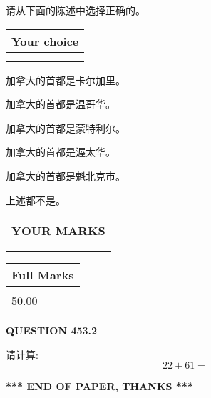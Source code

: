 \documentclass{ctexart}
\begin{document}
  
请从下面的陈述中选择正确的。
  
  
\noindent\hspace{3.0in} \begin{tabular}{|l|}
\hline
Your choice \\
\hline
 \\ 
 \\ 
\hline
\end{tabular}
  
  
 
 
加拿大的首都是卡尔加里。
 
 
加拿大的首都是温哥华。
 
 
加拿大的首都是蒙特利尔。
 
 
加拿大的首都是渥太华。
 
 
加拿大的首都是魁北克市。
 
 
 上述都不是。
 
 
  
\vspace{0.2in}
  
\noindent\begin{tabular}{|l|}
\hline
 YOUR MARKS  \\
\hline
 \\ 
 \\ 
\hline
\end{tabular}
\hspace{0.05in} \begin{tabular}{|l|}
\hline
 Full Marks  \\
\hline
 \\ 
50.00 \\
\hline
\end{tabular}
{\textbf{\Large{QUESTION
453.2 
}}}
  
  
 
请计算:
\begin{equation}
22 +  %
61 = \nonumber
\end{equation}
 

 

 
   
   
 \vspace{0.2in}
 
   
   
   
   
\vspace{1.0in} 
{\textbf{\large{ *** END OF PAPER, THANKS *** }}} 
   
\end{document}

